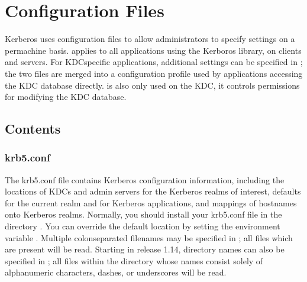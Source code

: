 \documentclass[letterpaper,10pt,english]{sphinxmanual}
\begin{document}
\chapter{Configuration Files}
\label{\detokenize{admin/conf_files/index:configuration-files}}\label{\detokenize{admin/conf_files/index::doc}}
\sphinxAtStartPar
Kerberos uses configuration files to allow administrators to specify
settings on a per\sphinxhyphen{}machine basis.  {\hyperref[\detokenize{admin/conf_files/krb5_conf:krb5-conf-5}]{}} applies to all
applications using the Kerboros library, on clients and servers.
For KDC\sphinxhyphen{}specific applications, additional settings can be specified in
{\hyperref[\detokenize{admin/conf_files/kdc_conf:kdc-conf-5}]{}}; the two files are merged into a configuration profile
used by applications accessing the KDC database directly.  {\hyperref[\detokenize{admin/conf_files/kadm5_acl:kadm5-acl-5}]{}}
is also only used on the KDC, it controls permissions for modifying the
KDC database.


\section{Contents}
\label{\detokenize{admin/conf_files/index:contents}}
\sphinxstepscope


\subsection{krb5.conf}
\label{\detokenize{admin/conf_files/krb5_conf:krb5-conf}}\label{\detokenize{admin/conf_files/krb5_conf:krb5-conf-5}}\label{\detokenize{admin/conf_files/krb5_conf::doc}}
\sphinxAtStartPar
The krb5.conf file contains Kerberos configuration information,
including the locations of KDCs and admin servers for the Kerberos
realms of interest, defaults for the current realm and for Kerberos
applications, and mappings of hostnames onto Kerberos realms.
Normally, you should install your krb5.conf file in the directory
.  You can override the default location by setting the
environment variable .  Multiple colon\sphinxhyphen{}separated
filenames may be specified in ; all files which are
present will be read.  Starting in release 1.14, directory names can
also be specified in ; all files within the directory
whose names consist solely of alphanumeric characters, dashes, or
underscores will be read.
\end{document}
